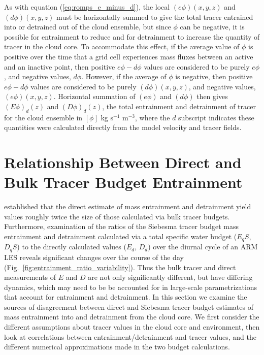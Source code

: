 \documentclass[12pt]{article}
\begin{document}
As with equation (\ref{eq:romps_e_minus_d}), the local $(e\phi)(x,y,z)$
and $(d\phi)(x,y,z)$ must be horizontally summed to give the total
tracer entrained into or detrained out of the cloud ensemble, but
since $\phi$ can be negative, it is possible for entrainment to reduce
and for detrainment to increase the quantity of tracer in the cloud
core.  To accommodate this effect, if the average value of $\phi$ is
positive over the time that a grid cell experiences mass fluxes
between an active and an inactive point, then positive $e\phi-d\phi$
values are considered to be purely $e\phi$, and negative
values, $d\phi$.  However, if the average of $\phi$ is
negative, then positive $e\phi-d\phi$ values are considered to be
purely $(d\phi)(x,y,z)$, and negative values, $(e\phi)(x,y,z)$.
Horizontal summation of $(e\phi)$ and $(d\phi)$ then gives
$(E\phi)_d(z)$ and $(D\phi)_d(z)$, the total entrainment and
detrainment of tracer for the cloud ensemble in $[\phi]$ kg s$^{-1}$
m$^{-3}$, where the $d$ subscript indicates these quantities were
calculated directly from the model velocity and tracer fields.


\section{Relationship Between Direct and Bulk Tracer Budget Entrainment}

\cite{Romps2010} established that the direct estimate of mass
entrainment and detrainment yield values roughly twice the size of
those calculated via bulk tracer budgets.  Furthermore, examination of
the ratios of the Siebesma tracer budget mass entrainment and detrainment
calculated via a total specific water budget ($E_qS$, $D_qS$) to the
directly calculated values ($E_d$, $D_d$) over the diurnal cycle of an
ARM LES reveals significant changes over the course of the day
(Fig.~\ref{fig:entrainment_ratio_variability}).  Thus the bulk tracer
and direct measurements of $E$ and $D$ are not only significantly
different, but have differing dynamics, which may need to be be accounted for
in large-scale parametrizations that account for entrainment and
detrainment.  In this section we examine the sources of disagreement
between direct and Siebesma tracer budget estimates of mass
entrainment into and detrainment from the cloud core. We first
consider the different assumptions about tracer values in the cloud
core and environment, then look at correlations between
entrainment/detrainment and tracer values, and the different numerical
approximations made in the two budget calculations.
\end{document}
